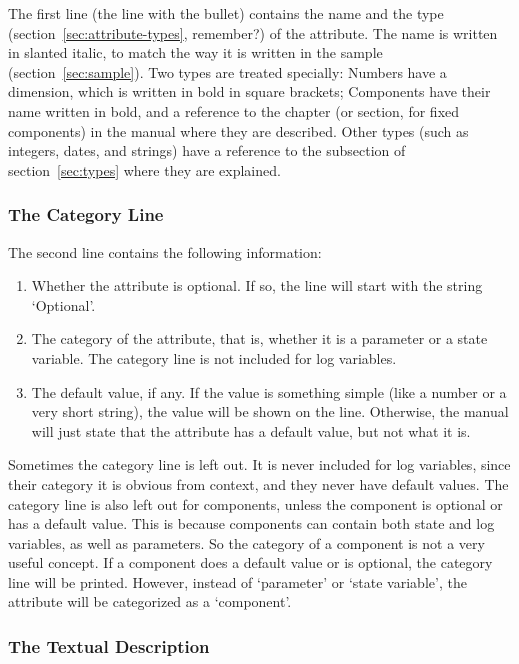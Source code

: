 The first line (the line with the bullet) contains the name and the
type (section~\ref{sec:attribute-types}, remember?) of the attribute.
The name is written in slanted italic, to match the way it is written
in the sample (section~\ref{sec:sample}).  Two types are treated
specially: Numbers have a dimension, which is written in bold in
square brackets; Components have their name written in bold, and a
reference to the chapter (or section, for fixed components) in the
manual where they are described.  Other types (such as integers,
dates, and strings) have a reference to the subsection of
section~\ref{sec:types} where they are explained.

\subsubsection{The Category Line}

The second line contains the following information:
\begin{enumerate}
\item Whether the attribute is optional.  If so, the line will start
  with the string `Optional'.
\item The category of the attribute, that is, whether it is a
  parameter or a state variable.  The category line is not included
  for log variables.
\item The default value, if any.  If the value is something simple
  (like a number or a very short string), the value will be shown on
  the line.  Otherwise, the manual will just state that the attribute
  has a default value, but not what it is.
\end{enumerate}

Sometimes the category line is left out.  It is never included for log
variables, since their category it is obvious from context, and they
never have default values.  The category line is also left out for
components, unless the component is optional or has a default value.
This is because components can contain both state and log variables, as
well as parameters. So the category of a component is not a very
useful concept.  If a component does a default value or is optional,
the category line will be printed.  However, instead of `parameter' or
`state variable', the attribute will be categorized as a `component'.

\subsubsection{The Textual Description}

